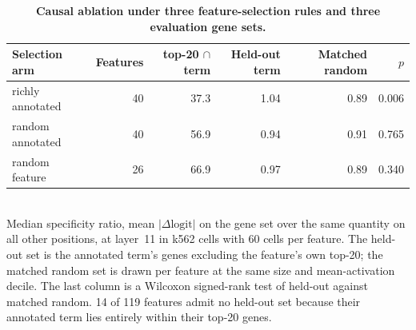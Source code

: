 \begin{table}[htbp]
\centering
\caption{\textbf{Causal ablation under three feature-selection rules and three evaluation gene sets.}}
\label{tab:causal_arms}
\smallskip
\small
\begin{tabular}{lrrrrr}
\toprule
Selection arm & Features & top-20 $\cap$ term & Held-out term & Matched random & $p$ \\
\midrule
richly annotated & 40 & 37.3 & 1.04 & 0.89 & 0.006 \\
random annotated & 40 & 56.9 & 0.94 & 0.91 & 0.765 \\
random feature & 26 & 66.9 & 0.97 & 0.89 & 0.340 \\
\bottomrule
\end{tabular}
\\[2pt]
\footnotesize Median specificity ratio, mean $|\Delta\text{logit}|$ on the gene set over the same quantity on all other positions, at layer~11 in k562 cells with 60 cells per feature. The held-out set is the annotated term's genes excluding the feature's own top-20; the matched random set is drawn per feature at the same size and mean-activation decile. The last column is a Wilcoxon signed-rank test of held-out against matched random. 14 of 119 features admit no held-out set because their annotated term lies entirely within their top-20 genes.
\end{table}
